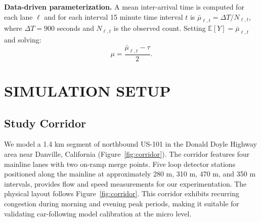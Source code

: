 \documentclass{scspaperproc}
\theoremstyle{scsthe}
\begin{document}
\textbf{Data-driven parameterization.}
A mean inter-arrival time is computed for each lane $\ell$ and for each interval 15 minute time interval $t$ is $\bar{\mu}_{\ell,t} = \Delta T / N_{\ell,t}$, where $\Delta T = 900$ seconds and $N_{\ell,t}$ is the observed count. Setting $\mathbb{E}[Y] = \bar{\mu}_{\ell,t}$ and solving:
\begin{equation}
\label{eq:erlang-param}
\mu = \frac{\bar{\mu}_{\ell,t} - \tau}{2}.
\end{equation}

\section{SIMULATION SETUP}
\label{sec:setup}
\subsection{Study Corridor}
We model a 1.4 km segment of northbound US-101 in the Donald Doyle Highway area  near Danville, California (Figure~\ref{fig:corridor}). The corridor features four mainline lanes with two on-ramp merge points. Five loop detector stations positioned along the mainline at approximately 280 m, 310 m, 470 m, and 350 m intervals, provides flow and speed measurements for our experimentation.
The physical layout follows Figure~\ref{fig:corridor}. This corridor exhibits recurring congestion 
during morning and evening peak periods, making it suitable for validating car-following model calibration at the micro level.
\end{document}
